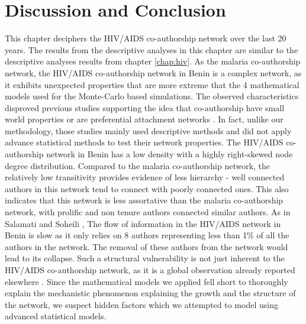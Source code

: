 \pagebreak
\section{Discussion and Conclusion}
\label{sec:hiv_discussion}
This chapter deciphers the HIV/AIDS co-authorship network over the last 20 years. The results from the descriptive analyses in this chapter are similar to the descriptive analyses results from chapter \ref{chap:hiv}. As the malaria co-authorship network, the HIV/AIDS co-authorship network in Benin is a complex network, as it exhibits unexpected properties that are more extreme that the 4 mathematical models used for the Monte-Carlo based simulations. The observed characteristics disproved previous studies supporting the idea that co-authorship have small world properties \cite{gonzalez-alcaide_scientific_2012} or are preferential attachment networks \citep{wagner_network_2005}. In fact, unlike our methodology, those studies mainly used descriptive methods and did not apply advance statistical methods to test their network properties.
The HIV/AIDS co-authorship network in Benin has a low density with a highly right-skewed node degree distribution. Compared to the malaria co-authorship network, the relatively low transitivity provides evidence of less hierarchy - well connected authors in this network tend to connect with poorly connected ones. This also indicates that this network is less assortative than the malaria co-authorship network, with prolific and non tenure authors connected similar authors.
As in Salamati and Soheili \cite{salamati_social_2016}, The flow of information in the HIV/AIDS network in Benin is slow as it only relies on 8 authors representing less than 1\% of all the authors in the network. The removal of these authors from the network would lead to its collapse. Such a structural vulnerability is not just inherent to the HIV/AIDS co-authorship network, as it is a global observation already reported elsewhere \cite{toivanen_african_2011}.  Since the mathematical models we applied fell short to thoroughly explain the mechanistic phenomenon explaining the growth and the structure of the network, we suspect hidden factors which we attempted to model using advanced statistical models. \\
